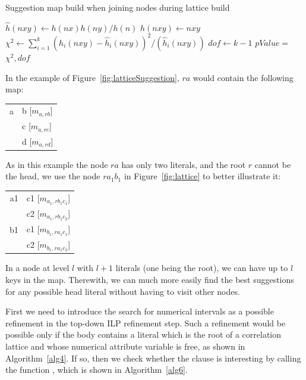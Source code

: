 \begin{algorithm}[h!]
 \caption{Suggestion map build when joining nodes during lattice build}
  $\hat{h}(nxy) \leftarrow h(nx)h(ny)/h(n)$\;
  $h(nxy) \leftarrow $$nxy$\FuncSty{)}\;
  $\chi^2 \leftarrow \sum_{i=1}^{k}(h_i(nxy)-\hat{h}_i(nxy))^2/(\hat{h}_i(nxy))$\;
  $dof \leftarrow k-1$\;
  $pValue = $$\chi^2,dof$\FuncSty{)}\;
 \label{alg:buildmaps}
\end{algorithm}

In the example of Figure~\ref{fig:latticeSuggestion}, $ra$ would contain the following map:

\begin{center}
  \begin{tabular}{r | l}
    a & b [$m_{a,rb}$] \\
      & c [$m_{a,rc}$] \\
      & d [$m_{a,rd}$]
  \end{tabular}
\end{center}

As in this example the node $ra$ has only two literals, and the root $r$ cannot be the head, we use the node $ra_1b_1$
in Figure~\ref{fig:lattice} to better illustrate it:

\begin{center}
  \begin{tabular}{r | l}
    a1 	& c1 [$m_{a_1,rb_1c_1}$] \\
	& c2 [$m_{a_1,rb_1c_2}$] \\
    \hline
    b1	& c1 [$m_{b_1,ra_1c_1}$] \\
	& c2 [$m_{b_1,ra_1c_2}$]
  \end{tabular}
\end{center}

In a node at level $l$ with $l+1$ literals (one being the root), we can have up to $l$ keys in the map. Therewith, we
can much more easily find the best suggestions for any possible head literal without having to visit other nodes.

First we need to introduce the search for numerical intervals as a possible refinement in the top-down ILP refinement
step. Such a refinement would be possible only if the body contains a literal which is the root of a correlation
lattice and whose numerical attribute variable is free, as shown in Algorithm~\ref{alg4}. If so, then we check whether
the clause is interesting by calling the function , which is shown in Algorithm~\ref{alg6}.


